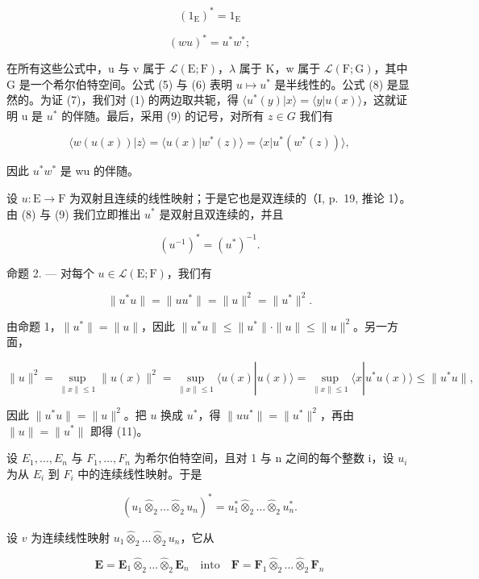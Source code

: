\[
(1 _ {\mathrm{E}}) ^ {*} = 1 _ {\mathrm{E}}\tag{8}
\]

\[
(w u) ^ {*} = u ^ {*} w ^ {*};\tag{9}
\]

在所有这些公式中，u 与 v 属于 \(\mathcal{L}(\mathrm{E};\mathrm{F})\)，\(\lambda\) 属于 K，w 属于 \(\mathcal{L}(\mathrm{F};\mathrm{G})\)，其中 G 是一个希尔伯特空间。公式 (5) 与 (6) 表明 \(u\mapsto u^{*}\) 是半线性的。公式 (8) 是显然的。为证 (7)，我们对 (1) 的两边取共轭，得 \(\langle u^{*}(y)|x\rangle = \langle y|u(x)\rangle\)，这就证明 u 是 \(u^{*}\) 的伴随。最后，采用 (9) 的记号，对所有 \(z \in G\) 我们有

\[
\langle w (u (x)) | z \rangle = \langle u (x) | w ^ {*} (z) \rangle = \langle x | u ^ {*} (w ^ {*} (z)) \rangle ,
\]

因此 \(u^{*}w^{*}\) 是 wu 的伴随。

设 \(u: \mathrm{E} \to \mathrm{F}\) 为双射且连续的线性映射；于是它也是双连续的（I, p.~19, 推论 1）。由 (8) 与 (9) 我们立即推出 \(u^*\) 是双射且双连续的，并且

\[
(u ^ {- 1}) ^ {*} = (u ^ {*}) ^ {- 1}.\tag{10}
\]

命题 2. --- 对每个 \(u \in \mathcal{L}(\mathrm{E};\mathrm{F})\)，我们有

\[
\| u ^ {*} u \| = \| u u ^ {*} \| = \| u \| ^ {2} = \| u ^ {*} \| ^ {2}.\tag{11}
\]

由命题 1，\(\| u^{*}\| = \| u\|\)，因此 \(\| u^{*}u\| \leqslant \| u^{*}\| \cdot \| u\| \leqslant \| u\|^2\)。另一方面，

\[
\| u \| ^ {2} = \sup _ {\| x \| \leqslant 1} \| u (x) \| ^ {2} = \sup _ {\| x \| \leqslant 1} \langle u (x) | u (x) \rangle = \sup _ {\| x \| \leqslant 1} \langle x | u ^ {*} u (x) \rangle \leqslant \| u ^ {*} u \|,
\]

因此 \(\| u^{*}u\| = \| u\|^2\)。把 \(u\) 换成 \(u^{*}\)，得 \(\| uu^{*}\| = \| u^{*}\|^2\)，再由 \(\| u\| = \| u^{*}\|\) 即得 (11)。

设 \(E_{1}, \ldots, E_{n}\) 与 \(F_{1}, \ldots, F_{n}\) 为希尔伯特空间，且对 1 与 n 之间的每个整数 i，设 \(u_{i}\) 为从 \(E_{i}\) 到 \(F_{i}\) 中的连续线性映射。于是

\[
(u _ {1} \hat {\otimes} _ {2} \dots \hat {\otimes} _ {2} u _ {n}) ^ {*} = u _ {1} ^ {*} \hat {\otimes} _ {2} \dots \hat {\otimes} _ {2} u _ {n} ^ {*}.\tag{12}
\]

设 \(v\) 为连续线性映射 \(u_1 \hat{\otimes}_2 \ldots \hat{\otimes}_2 u_n\)，它从

\[
\mathbf {E} = \mathbf {E} _ {1} \hat {\otimes} _ {2} \dots \hat {\otimes} _ {2} \mathbf {E} _ {n} \quad \text {into} \quad \mathbf {F} = \mathbf {F} _ {1} \hat {\otimes} _ {2} \dots \hat {\otimes} _ {2} \mathbf {F} _ {n}
\]

